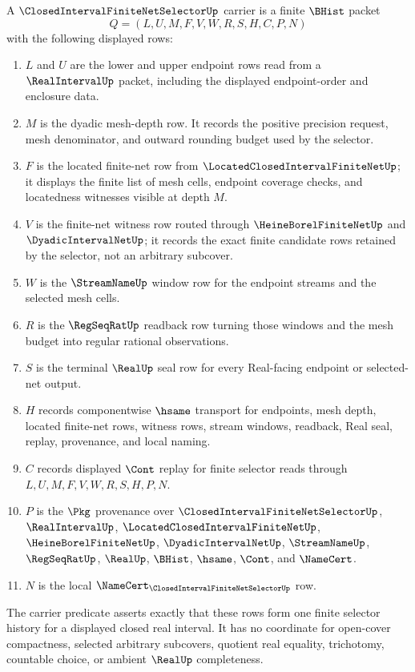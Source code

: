 \begin{definition}
\label{def:closed-interval-finite-net-selector-carrier}
A $\ClosedIntervalFiniteNetSelectorUp$ carrier is a finite $\BHist$ packet
$$
Q=(L,U,M,F,V,W,R,S,H,C,P,N)
$$
with the following displayed rows:
\begin{enumerate}
\item $L$ and $U$ are the lower and upper endpoint rows read from a $\RealIntervalUp$ packet, including the displayed endpoint-order and enclosure data.
\item $M$ is the dyadic mesh-depth row. It records the positive precision request, mesh denominator, and outward rounding budget used by the selector.
\item $F$ is the located finite-net row from $\LocatedClosedIntervalFiniteNetUp$; it displays the finite list of mesh cells, endpoint coverage checks, and locatedness witnesses visible at depth $M$.
\item $V$ is the finite-net witness row routed through $\HeineBorelFiniteNetUp$ and $\DyadicIntervalNetUp$; it records the exact finite candidate rows retained by the selector, not an arbitrary subcover.
\item $W$ is the $\StreamNameUp$ window row for the endpoint streams and the selected mesh cells.
\item $R$ is the $\RegSeqRatUp$ readback row turning those windows and the mesh budget into regular rational observations.
\item $S$ is the terminal $\RealUp$ seal row for every Real-facing endpoint or selected-net output.
\item $H$ records componentwise $\hsame$ transport for endpoints, mesh depth, located finite-net rows, witness rows, stream windows, readback, Real seal, replay, provenance, and local naming.
\item $C$ records displayed $\Cont$ replay for finite selector reads through $L,U,M,F,V,W,R,S,H,P,N$.
\item $P$ is the $\Pkg$ provenance over $\ClosedIntervalFiniteNetSelectorUp$, $\RealIntervalUp$, $\LocatedClosedIntervalFiniteNetUp$, $\HeineBorelFiniteNetUp$, $\DyadicIntervalNetUp$, $\StreamNameUp$, $\RegSeqRatUp$, $\RealUp$, $\BHist$, $\hsame$, $\Cont$, and $\NameCert$.
\item $N$ is the local $\NameCert_{\ClosedIntervalFiniteNetSelectorUp}$ row.
\end{enumerate}
The carrier predicate asserts exactly that these rows form one finite selector history for a displayed closed real interval. It has no coordinate for open-cover compactness, selected arbitrary subcovers, quotient real equality, trichotomy, countable choice, or ambient $\RealUp$ completeness.
\end{definition}

